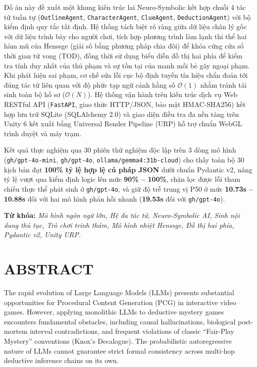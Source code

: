 Đồ án này đề xuất một khung kiến trúc lai Neuro-Symbolic kết hợp chuỗi 4 tác tử tuần tự (\texttt{OutlineAgent}, \texttt{CharacterAgent}, \texttt{ClueAgent}, \texttt{DeductionAgent}) với bộ kiểm định quy tắc tất định. Hệ thống tách biệt rõ ràng giữa dữ liệu chân lý gốc với dữ liệu trình bày cho người chơi, tích hợp phương trình làm lạnh thi thể hai hàm mũ của Henssge (giải số bằng phương pháp chia đôi) để khóa cứng cửa sổ thời gian tử vong (TOD), đồng thời sử dụng biểu diễn đồ thị hai phía để kiểm tra tính duy nhất của thủ phạm và sự tồn tại của manh mối bẻ gãy ngoại phạm. Khi phát hiện sai phạm, cơ chế sửa lỗi cục bộ định tuyến tín hiệu chẩn đoán tới đúng tác tử liên quan với độ phức tạp ngữ cảnh hằng số $\mathcal{O}(1)$ nhằm tránh tái sinh toàn bộ hồ sơ ($\mathcal{O}(N)$). Hệ thống vận hành trên kiến trúc dịch vụ Web RESTful API (\texttt{FastAPI}, giao thức HTTP/JSON, bảo mật HMAC-SHA256) kết hợp lưu trữ SQLite (SQLAlchemy 2.0) và giao diện điều tra đa nền tảng trên Unity 6 kết xuất bằng Universal Render Pipeline (URP) hỗ trợ chuẩn WebGL trình duyệt và máy trạm.

Kết quả thực nghiệm qua 30 phiên thử nghiệm độc lập trên 3 dòng mô hình (\texttt{gh/gpt-4o-mini}, \texttt{gh/gpt-4o}, \texttt{ollama/gemma4:31b-cloud}) cho thấy toàn bộ 30 kịch bản đạt \textbf{100\% tỷ lệ hợp lệ cú pháp JSON} dưới chuẩn Pydantic v2, nâng tỷ lệ vượt qua kiểm định logic lên mức \textbf{90\% -- 100\%}, chặn lọc được lỗi tham chiếu thực thể phát sinh ở \texttt{gh/gpt-4o}, và giữ độ trễ trung vị P50 ở mức \textbf{10.73s -- 10.88s} đối với hai mô hình phản hồi nhanh (\textbf{19.53s} đối với \texttt{gh/gpt-4o}).

\vspace{0.5cm}
\noindent\textbf{Từ khóa:} \textit{Mô hình ngôn ngữ lớn, Hệ đa tác tử, Neuro-Symbolic AI, Sinh nội dung thủ tục, Trò chơi trinh thám, Mô hình nhiệt Henssge, Đồ thị hai phía, Pydantic v2, Unity URP.}

\newpage
\chapter*{ABSTRACT}

The rapid evolution of Large Language Models (LLMs) presents substantial opportunities for Procedural Content Generation (PCG) in interactive video games. However, applying monolithic LLMs to deductive mystery games encounters fundamental obstacles, including causal hallucinations, biological post-mortem interval contradictions, and frequent violations of classic ``Fair-Play Mystery'' conventions (Knox's Decalogue). The probabilistic autoregressive nature of LLMs cannot guarantee strict formal consistency across multi-hop deductive inference chains on its own.

